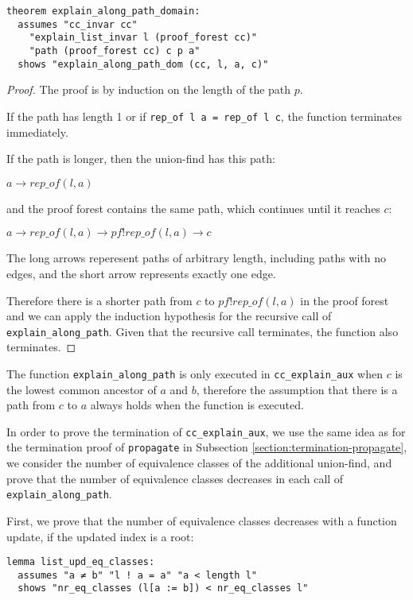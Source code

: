 \begin{lstlisting}
theorem explain_along_path_domain:
  assumes "cc_invar cc"
    "explain_list_invar l (proof_forest cc)"
    "path (proof_forest cc) c p a"
  shows "explain_along_path_dom (cc, l, a, c)"
\end{lstlisting}

\begin{proof}
The proof is by induction on the length of the path $p$.

If the path has length 1 or if \lstinline{rep_of l a = rep_of l c}, the function terminates immediately.

If the path is longer, then the union-find has this path:

$a \longrightarrow rep\_of(l,a)$

and the proof forest contains the same path, which continues until it reaches $c$:

$a \longrightarrow rep\_of(l,a) \rightarrow pf ! rep\_of(l,a) \longrightarrow c$

The long arrows reperesent paths of arbitrary length, including paths with no edges, and the short arrow represents exactly one edge.

Therefore there is a shorter path from $c$ to $pf ! rep\_of(l,a)$ in the proof forest and we can apply the induction hypothesis for the recursive call of \lstinline{explain_along_path}. Given that the recursive call terminates, the function also terminates.
\end{proof}

The function \lstinline{explain_along_path} is only executed in \lstinline{cc_explain_aux} when $c$ is the lowest common ancestor of $a$ and $b$, therefore the assumption that there is a path from $c$ to $a$ always holds when the function is executed.

In order to prove the termination of \lstinline{cc_explain_aux}, we use the same idea as for the termination proof of \lstinline{propagate} in Subsection \ref{section:termination-propagate}, we consider the number of equivalence classes of the additional union-find, and prove that the number of equivalence classes decreases in each call of \lstinline{explain_along_path}.

First, we prove that the number of equivalence classes decreases with a function update, if the updated index is a root:

\begin{lstlisting}
lemma list_upd_eq_classes:
  assumes "a ≠ b" "l ! a = a" "a < length l"
  shows "nr_eq_classes (l[a := b]) < nr_eq_classes l"
\end{lstlisting}

